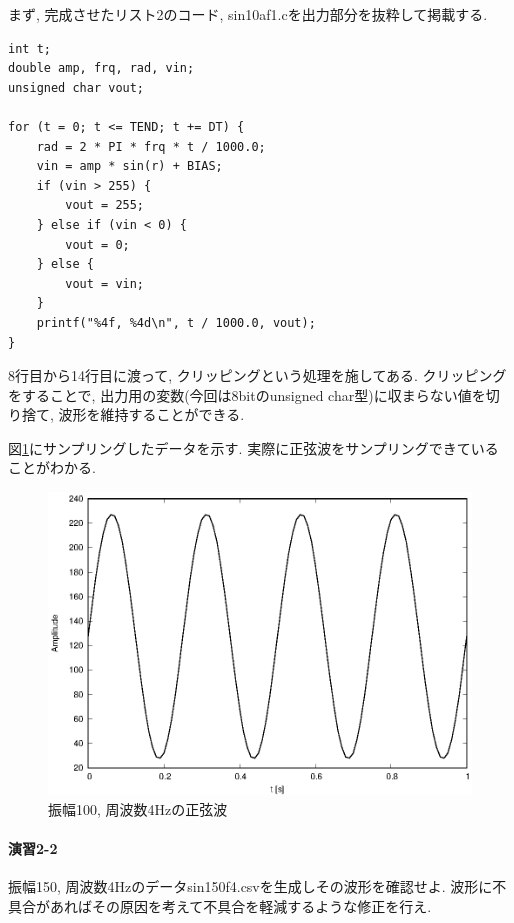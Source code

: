 \documentclass[titlepage]{jsarticle}
\begin{document}
        まず, 完成させたリスト2のコード, sin10af1.cを出力部分を抜粋して掲載する.

        \begin{lstlisting}[caption=sin10af1.c, label=src:sin10af1]
int t;
double amp, frq, rad, vin;
unsigned char vout;

for (t = 0; t <= TEND; t += DT) {
    rad = 2 * PI * frq * t / 1000.0;
    vin = amp * sin(r) + BIAS;
    if (vin > 255) {
        vout = 255;
    } else if (vin < 0) {
        vout = 0;
    } else {
        vout = vin;
    }
    printf("%4f, %4d\n", t / 1000.0, vout);
}
        \end{lstlisting}

        8行目から14行目に渡って, クリッピングという処理を施してある.
        クリッピングをすることで, 出力用の変数(今回は8bitのunsigned char型)に収まらない値を切り捨て,
        波形を維持することができる.

        図\ref{fig:sin100f4}にサンプリングしたデータを示す.
        実際に正弦波をサンプリングできていることがわかる.

        \begin{figure}[ht]
            \centering
            \includegraphics[width=12cm]{images/sin100f4.eps}
            \caption{振幅100, 周波数4Hzの正弦波}
            \label{fig:sin100f4}
        \end{figure}

    \paragraph{演習2-2} 振幅150, 周波数4Hzのデータsin150f4.csvを生成しその波形を確認せよ.
    波形に不具合があればその原因を考えて不具合を軽減するような修正を行え.
        
\end{document}
